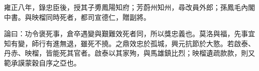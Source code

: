 \begin{pinyinscope}
雍正八年，錄忠臣後，授其子旉鳳陽知府；芳蔚州知州，尋改員外郎；孫鳳毛內閣中書。與映榴同時死者，都司宣德仁，贈副將。

論曰：功令褒死事，倉卒遇變與艱難效死者同，所以獎忠義也。莫洛與福，先事宜知有變，師行有進無退，雖死不撓。之鼎效忠於孤城，興元抗節於大憝。若啟泰、丹赤、映榴，皆能死其官者。啟泰以其家殉，與馬雄鎮比烈；映榴遺疏款款，則又範承謨蒙穀自序之亞也。


\end{pinyinscope}